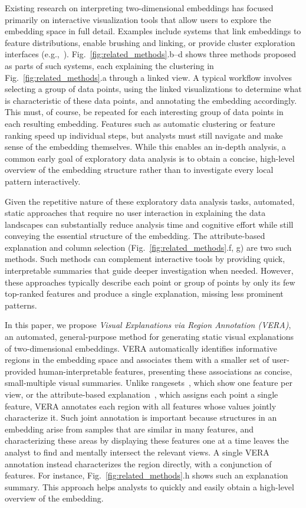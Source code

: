 \documentclass[lettersize,journal]{IEEEtran}
\begin{document}
Existing research on interpreting two-dimensional embeddings has focused primarily on interactive visualization tools that allow users to explore the embedding space in full detail. Examples include systems that link embeddings to feature distributions, enable brushing and linking, or provide cluster exploration interfaces (e.g.,~\cite{Endert2014,Krause2014}).
Fig.~\ref{fig:related_methods}.b--d shows three methods proposed as parts of such systems, each explaining the clustering in Fig.~\ref{fig:related_methods}.a through a linked view.
A typical workflow involves selecting a group of data points, using the linked visualizations to determine what is characteristic of these data points, and annotating the embedding accordingly.
This must, of course, be repeated for each interesting group of data points in each resulting embedding.
Features such as automatic clustering or feature ranking speed up individual steps, but analysts must still navigate and make sense of the embedding themselves.
While this enables an in-depth analysis, a common early goal of exploratory data analysis is to obtain a concise, high-level overview of the embedding structure rather than to investigate every local pattern interactively.

Given the repetitive nature of these exploratory data analysis tasks, automated, static approaches that require no user interaction in explaining the data landscapes can substantially reduce analysis time and cognitive effort while still conveying the essential structure of the embedding.
The attribute-based explanation and column selection (Fig.~\ref{fig:related_methods}.f, g) are two such methods.
Such methods can complement interactive tools by providing quick, interpretable summaries that guide deeper investigation when needed.
However, these approaches typically describe each point or group of points by only its few top-ranked features and produce a single explanation, missing less prominent patterns.

In this paper, we propose \textit{Visual Explanations via Region Annotation (VERA)}, an automated, general-purpose method for generating static visual explanations of two-dimensional embeddings. VERA automatically identifies informative regions in the embedding space and associates them with a smaller set of user-provided human-interpretable features, presenting these associations as concise, small-multiple visual summaries. Unlike rangesets~\cite{Sohns2022}, which show one feature per view, or the attribute-based explanation~\cite{DaSilva2015}, which assigns each point a single feature, VERA annotates each region with all features whose values jointly characterize it. Such joint annotation is important because structures in an embedding arise from samples that are similar in many features, and characterizing these areas by displaying these features one at a time leaves the analyst to find and mentally intersect the relevant views. A single VERA annotation instead characterizes the region directly, with a conjunction of features. For instance, Fig.~\ref{fig:related_methods}.h shows such an explanation summary. This approach helps analysts to quickly and easily obtain a high-level overview of the embedding.
\end{document}
